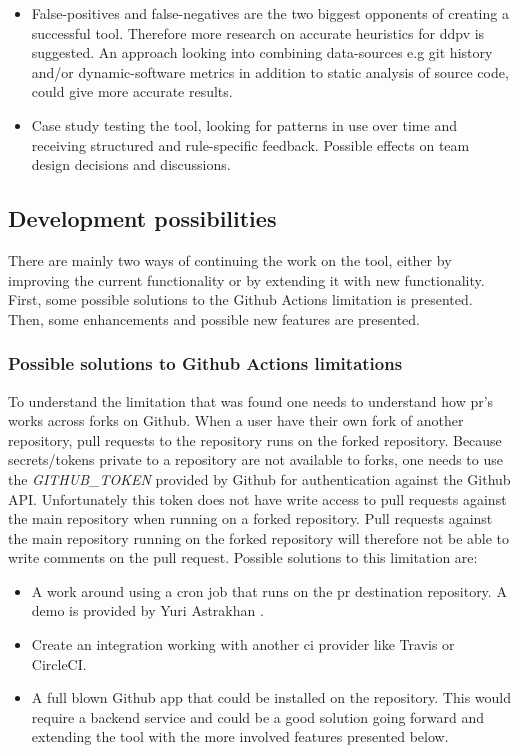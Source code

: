 \documentclass{report}
\begin{document}
\begin{itemize}
    \item False-positives and false-negatives are the two biggest opponents of creating a successful tool. Therefore more research on accurate heuristics for \gls{ddpv} is suggested. An approach looking into combining data-sources e.g git history and/or dynamic-software metrics in addition to static analysis of source code, could give more accurate results. 

    \item Case study testing the tool, looking for patterns in use over time and receiving structured and rule-specific feedback. Possible effects on team design decisions and discussions.   
\end{itemize}


\subsection{Development possibilities}
There are mainly two ways of continuing the work on the tool, either by improving the current functionality or by extending it with new functionality. First, some possible solutions to the Github Actions limitation is presented. Then, some enhancements and possible new features are presented.


\subsubsection{Possible solutions to Github Actions limitations}

\label{possible-solutions}
To understand the limitation that was found one needs to understand how \gls{pr}'s works across forks on Github. When a user have their own fork of another repository, pull requests to the repository runs on the forked repository. Because secrets/tokens private to a repository are not available to forks, one needs to use the \textit{GITHUB\_TOKEN} provided by Github for authentication against the Github API. Unfortunately this token does not have write access to pull requests against the main repository when running on a forked repository. Pull requests against the main repository running on the forked repository will therefore not be able to write comments on the pull request. Possible solutions to this limitation are: 
\begin{itemize}
    \item A work around using a cron job that runs on the \gls{pr} destination repository. A demo is provided by Yuri Astrakhan \cite{workaround-demo}. 
    
    \item Create an integration working with another \gls{ci} provider like Travis or CircleCI. 
    
    \item A full blown Github app that could be installed on the repository. This would require a backend service and could be a good solution going forward and extending the tool with the more involved features presented below.
\end{itemize}
\end{document}
